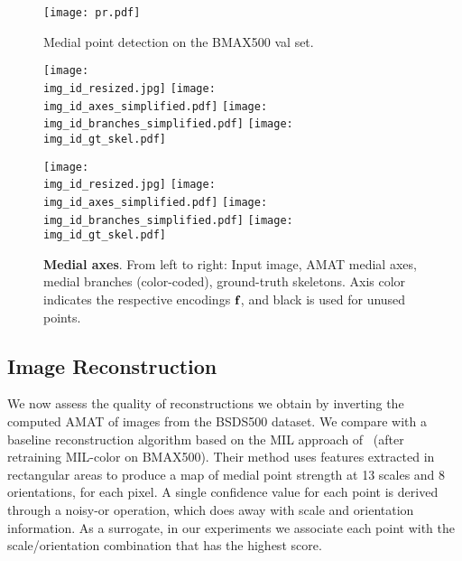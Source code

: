 \documentclass[10pt,twocolumn,letterpaper]{article}
\begin{document}
\begin{figure}
\centering
\texttt{[image: pr.pdf]}
\caption{Medial point detection on the BMAX500 val set.}
\label{fig:experiments:detection:pr}
\end{figure}

\begin{figure*}[t]
\centering
\def\imgw{0.245}
\def\img_id{3096}
\texttt{[image: \\img\_id\_resized.jpg]}
\texttt{[image: \\img\_id\_axes\_simplified.pdf]}
\texttt{[image: \\img\_id\_branches\_simplified.pdf]}
\texttt{[image: \\img\_id\_gt\_skel.pdf]}

\def\img_id{253055}
\texttt{[image: \\img\_id\_resized.jpg]}
\texttt{[image: \\img\_id\_axes\_simplified.pdf]}
\texttt{[image: \\img\_id\_branches\_simplified.pdf]}
\texttt{[image: \\img\_id\_gt\_skel.pdf]}


\caption{\textbf{Medial axes}. From left to right: Input image, AMAT medial axes, medial branches (color-coded), ground-truth skeletons.
Axis color indicates the respective encodings $\mathbf{f}_{}$, and black is used for unused points.}
\label{fig:experiments:detection:examples}
\end{figure*}


\subsection{Image Reconstruction}\label{sec:experiments:reconstruction}
We now assess the quality of reconstructions we obtain by inverting the computed AMAT
of images from the BSDS500 dataset.
We compare with a baseline reconstruction algorithm based on the MIL approach 
of~\cite{tsogkas2012learning} (after retraining MIL-color on BMAX500).
Their method uses features extracted in rectangular areas 
to produce a map of medial point strength at 13 scales and 8 orientations, for each pixel.
A single confidence value for each point is derived through a noisy-or operation,
which does away with scale and orientation information.
As a surrogate, in our experiments we associate each point with the scale/orientation combination
that has the highest score.
\end{document}
